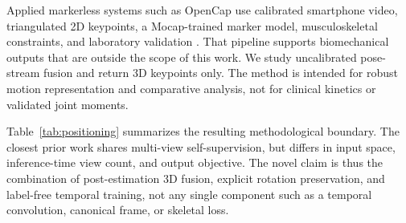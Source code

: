 Applied markerless systems such as OpenCap use calibrated smartphone video,
triangulated 2D keypoints, a Mocap-trained marker model, musculoskeletal
constraints, and laboratory validation \citep{Uhlrich2023OpenCap}. That pipeline
supports biomechanical outputs that are outside the scope of this work. We
study uncalibrated pose-stream fusion and return 3D keypoints only. The method is
intended for robust motion representation and comparative analysis, not for
clinical kinetics or validated joint moments.



Table~\ref{tab:positioning} summarizes the resulting methodological boundary.
The closest prior work shares multi-view self-supervision, but differs in input
space, inference-time view count, and output objective. The novel claim is thus
the combination of post-estimation 3D fusion, explicit rotation preservation,
and label-free temporal training, not any single component such as a temporal
convolution, canonical frame, or skeletal loss.
